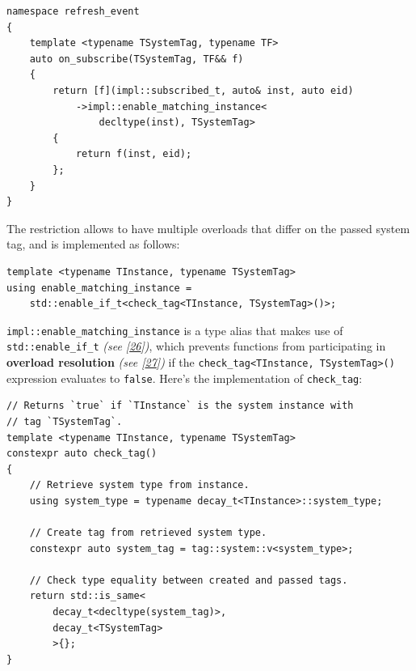 \documentclass[twoside, 12pt, a4paper, openany]{book}
\begin{document}
\begin{verbatim}
namespace refresh_event
{
    template <typename TSystemTag, typename TF>
    auto on_subscribe(TSystemTag, TF&& f)
    {
        return [f](impl::subscribed_t, auto& inst, auto eid)
            ->impl::enable_matching_instance<
                decltype(inst), TSystemTag>
        {
            return f(inst, eid);
        };
    }
}
\end{verbatim}

The restriction allows to have multiple overloads that differ on the
passed system tag, and is implemented as follows:

\begin{verbatim}
template <typename TInstance, typename TSystemTag>
using enable_matching_instance =
    std::enable_if_t<check_tag<TInstance, TSystemTag>()>;
\end{verbatim}

\texttt{impl::enable_matching_instance}
is a type alias that makes use of
\texttt{std::enable_if_t}
\emph{(see {[}\protect\hyperlink{ref-cppreference_enable_if}{26}{]})},
which prevents functions from participating in \textbf{overload
resolution} \emph{(see
{[}\protect\hyperlink{ref-cppreference_overload_resolution}{27}{]})} if
the
\texttt{check_tag<TInstance, TSystemTag>()}
expression evaluates to
\texttt{false}.
Here's the implementation of
\texttt{check_tag}:

\begin{verbatim}
// Returns `true` if `TInstance` is the system instance with
// tag `TSystemTag`.
template <typename TInstance, typename TSystemTag>
constexpr auto check_tag()
{
    // Retrieve system type from instance.
    using system_type = typename decay_t<TInstance>::system_type;

    // Create tag from retrieved system type.
    constexpr auto system_tag = tag::system::v<system_type>;

    // Check type equality between created and passed tags.
    return std::is_same<
        decay_t<decltype(system_tag)>,
        decay_t<TSystemTag>
        >{};
}
\end{verbatim}
\end{document}

